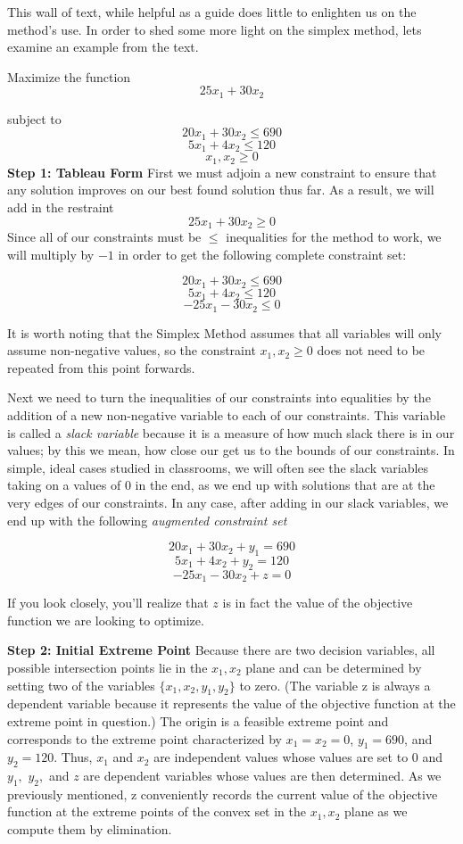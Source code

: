 This wall of text, while helpful as a guide does little to enlighten us on the method's use. In order to shed some more light on the simplex method, lets examine an example from the text.

\begin{example}
Maximize the function $$25x_1 + 30x_2$$

subject to
$$20x_1 + 30x_2 \leq 690$$
$$5x_1 + 4x_2 \leq 120$$
$$x_1 ,x_2 \geq 0$$ 
\textbf{Step 1: Tableau Form}\newline
First we must adjoin a new constraint to ensure that any solution improves on our best found solution thus far. As a result, we will add in the restraint $$25x_1 + 30x_2 \geq 0$$ Since all of our constraints must be $\leq$ inequalities for the method to work, we will multiply by $-1$ in order to get the following complete constraint set:

$$20x_1 + 30x_2 \leq 690$$
$$5x_1 + 4x_2 \leq 120$$
$$-25x_1 - 30x_2 \leq 0$$

It is worth noting that the Simplex Method assumes that all variables will only assume non-negative values, so the constraint $x_1, x_2 \geq 0$ does not need to be repeated from this point forwards.\newline

Next we need to turn the inequalities of our constraints into equalities by the addition of a new non-negative variable to each of our constraints. This variable is called a \emph{slack variable} because it is a measure of how much slack there is in our values; by this we mean, how close our get us to the bounds of our constraints. In simple, ideal cases studied in classrooms, we will often see the slack variables taking on a values of 0 in the end, as we end up with solutions that are at the very edges of our constraints. In any case, after adding in our slack variables, we end up with the following \emph{augmented constraint set}

$$20x_1 + 30x_2 + y_1 = 690$$
$$5x_1 + 4x_2 + y_2 = 120$$
$$-25x_1 - 30x_2 + z = 0$$

If you look closely, you'll realize that $z$ is in fact the value of the objective function we are looking to optimize. \newline

\textbf{Step 2: Initial Extreme Point}\newline
Because there are two decision variables, all possible intersection points lie in the $x_1,x_2$ plane and can be determined by setting two of the variables $\{ x_1, x_2, y_1, y_2\}$ to zero. (The variable z is always a dependent variable because it represents the value of the objective function at the extreme point in question.) The origin is a feasible extreme point and corresponds to the extreme point characterized by $x_1 = x_2 = 0$, $y_1 = 690$, and $y_2 = 120.$ Thus, $x_1$ and $x_2$ are independent values whose values are set to 0 and $y_1,$  $y_2,$ and $z$ are dependent variables whose values are then determined. As we previously mentioned, z conveniently records the current value of the objective function at the extreme points of the convex set in the $x_1,x_2$ plane as we compute them by elimination.\newline


\end{example}
